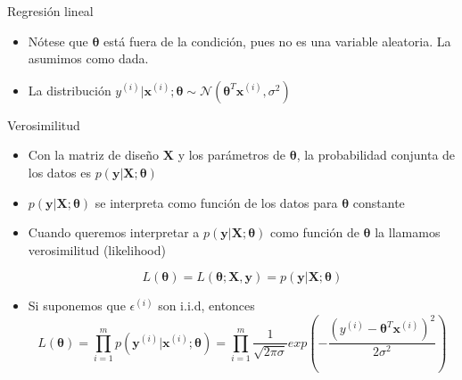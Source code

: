 \documentclass[10pt]{beamer}
\begin{document}
\begin{frame}[fragile]{Regresión lineal}

\begin{itemize}
\item Nótese que $\boldsymbol{\theta}$ está fuera de la condición, pues no es una variable aleatoria. La asumimos como dada.

\item La distribución $ y^{(i)}\vert\boldsymbol{x}^{(i)}; \boldsymbol{\theta}  \sim \mathcal{N} ({\boldsymbol{\theta} ^T}\boldsymbol{x}^{(i)}, \sigma^2)$

\end{itemize}


\end{frame}

\begin{frame}[fragile]{Verosimilitud}

\begin{itemize}
\item Con la matriz de diseño $\boldsymbol{X}$ y los parámetros de $\boldsymbol{\theta} $, la probabilidad conjunta de los datos es $p(\boldsymbol{y}\vert \boldsymbol{X}; \boldsymbol{\theta})$
\item $p(\boldsymbol{y}\vert \boldsymbol{X}; \boldsymbol{\theta})$ se interpreta como función de los datos para $\boldsymbol{\theta}$ constante

\item Cuando queremos interpretar a $p(\boldsymbol{y}\vert \boldsymbol{X}; \boldsymbol{\theta})$ como función de $\boldsymbol{\theta}$ la llamamos verosimilitud (likelihood)

\begin{equation*}
L(\boldsymbol{\theta})= L(\boldsymbol{\theta}; \boldsymbol{X},\boldsymbol{y})= p(\boldsymbol{y}\vert \boldsymbol{X};\boldsymbol{\theta})
\end{equation*}

\item Si suponemos que $\epsilon^{(i)}$ son i.i.d, entonces 
 \begin{equation*}
 L(\boldsymbol{\theta})=\prod_{i=1}^{m}{ p(\boldsymbol{y}^{(i)}\vert \boldsymbol{x}^{(i)};\boldsymbol{\theta})}= \prod_{i=1}^{m} \frac{1}{\sqrt{2\pi \sigma}} exp \left( -\frac{(y^{(i)}-{\boldsymbol{\theta} ^T}\boldsymbol{x}^{(i)})^2}{2\sigma^2} \right) 
 \end{equation*}

\end{itemize}


\end{frame}
\end{document}
